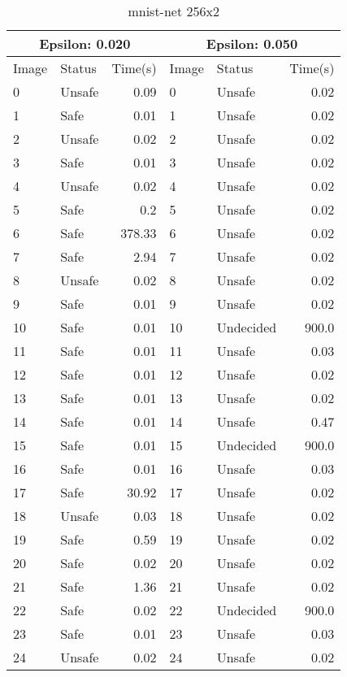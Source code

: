 \begin{table}[!ht]
  \centering
  \caption{mnist-net 256x2}
  \footnotesize
  \begin{tabular}{|llr|llr|}
    \toprule
    \multicolumn{3}{|c|}{Epsilon: 0.020} & \multicolumn{3}{|c|}{Epsilon: 0.050} \\
    \midrule
    Image & Status & Time(s) &Image & Status & Time(s)\\ 
    \midrule
    0 & Unsafe & 0.09 &    0 & Unsafe & 0.02\\ 
    1 & Safe & 0.01 &    1 & Unsafe & 0.02\\ 
    2 & Unsafe & 0.02 &    2 & Unsafe & 0.02\\ 
    3 & Safe & 0.01 &    3 & Unsafe & 0.02\\ 
    4 & Unsafe & 0.02 &    4 & Unsafe & 0.02\\ 
    5 & Safe & 0.2 &    5 & Unsafe & 0.02\\ 
    6 & Safe & 378.33 &    6 & Unsafe & 0.02\\ 
    7 & Safe & 2.94 &    7 & Unsafe & 0.02\\ 
    8 & Unsafe & 0.02 &    8 & Unsafe & 0.02\\ 
    9 & Safe & 0.01 &    9 & Unsafe & 0.02\\ 
    10 & Safe & 0.01 &    10 & Undecided & 900.0\\ 
    11 & Safe & 0.01 &    11 & Unsafe & 0.03\\ 
    12 & Safe & 0.01 &    12 & Unsafe & 0.02\\ 
    13 & Safe & 0.01 &    13 & Unsafe & 0.02\\ 
    14 & Safe & 0.01 &    14 & Unsafe & 0.47\\ 
    15 & Safe & 0.01 &    15 & Undecided & 900.0\\ 
    16 & Safe & 0.01 &    16 & Unsafe & 0.03\\ 
    17 & Safe & 30.92 &    17 & Unsafe & 0.02\\ 
    18 & Unsafe & 0.03 &    18 & Unsafe & 0.02\\ 
    19 & Safe & 0.59 &    19 & Unsafe & 0.02\\ 
    20 & Safe & 0.02 &    20 & Unsafe & 0.02\\ 
    21 & Safe & 1.36 &    21 & Unsafe & 0.02\\ 
    22 & Safe & 0.02 &    22 & Undecided & 900.0\\ 
    23 & Safe & 0.01 &    23 & Unsafe & 0.03\\ 
    24 & Unsafe & 0.02 &    24 & Unsafe & 0.02\\ 
    \bottomrule
  \end{tabular}
\end{table}

